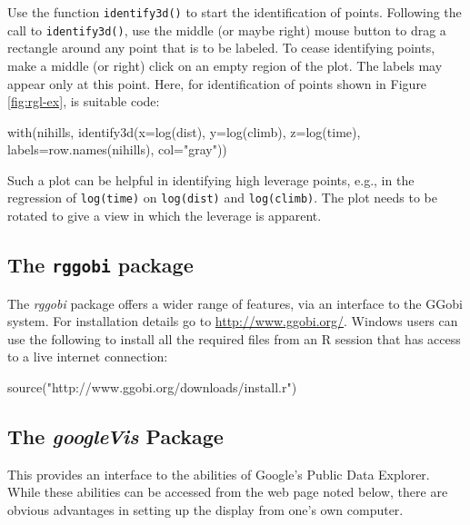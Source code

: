 \documentclass{tufte-book}\usepackage[]{graphicx}\usepackage[]{color}
\newcommand{\txtt}[1]{\texttt{#1}}
\begin{document}
Use the function \txtt{identify3d()} to start the identification of
points.  Following the call to \txtt{identify3d()}, use the middle (or
maybe right) mouse button to drag a rectangle around any point that is
to be labeled.  To cease identifying points, make a middle (or right)
click on an empty region of the plot.  The labels may appear only at
this point.  Here, for identification of points shown in Figure
\ref{fig:rgl-ex}, is suitable code:
\begin{Schunk}
\begin{Sinput}
with(nihills, identify3d(x=log(dist), y=log(climb),
                         z=log(time),
                         labels=row.names(nihills),
                         col="gray"))
\end{Sinput}
\end{Schunk}

Such a plot can be helpful in identifying high leverage points,
e.g., in the regression of \txtt{log(time)} on \txtt{log(dist)}
and \txtt{log(climb)}.  The plot needs to be rotated to give a view
in which the leverage is apparent.

\subsection*{The  \texttt{rggobi} package}

The \textit{rggobi} package offers a wider range of features, via an
interface to the GGobi system.  For installation details go to
\url{http://www.ggobi.org/}.  Windows users can use the following to
install all the required files from an R session that has access to a
live internet connection:
\begin{Schunk}
\begin{Sinput}
source("http://www.ggobi.org/downloads/install.r")
\end{Sinput}
\end{Schunk}

\subsection{The {\em googleVis} Package}\label{sec:gvis}

This provides an interface to the abilities of Google's Public Data
Explorer.  While these abilities can be accessed from the web page
noted below, there are obvious advantages in setting up the display
from one's own computer.
\end{document}
